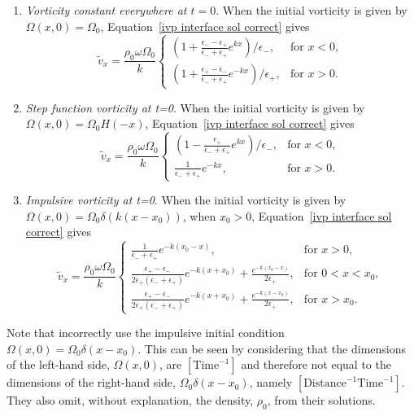 \documentclass[12pt]{../style-files/ociamthesis}
\begin{document}
\begin{enumerate}
	\item \textit{Vorticity constant everywhere at $t = 0$}. When the initial vorticity is given by $\Omega(x,0) = \Omega_0$, Equation~\eqref{ivp interface sol correct} gives
	\begin{equation}
	\tilde{v}_x = \frac{\rho_0\omega\Omega_0}{k}
	\begin{cases}
	(1 + \frac{\epsilon_- - \epsilon_+}{\epsilon_- + \epsilon_+}e^{kx})/\epsilon_-, & \text{for } x<0, \\
	(1 + \frac{\epsilon_+ - \epsilon_-}{\epsilon_- + \epsilon_+}e^{-kx})/\epsilon_+, & \text{for } x>0.
	\end{cases}
	\end{equation}
	\item \textit{Step function vorticity at t=0}. When the initial vorticity is given by $\Omega(x,0) = \Omega_0H(-x)$, Equation~\eqref{ivp interface sol correct} gives
	\begin{equation}
	\tilde{v}_x = \frac{\rho_0\omega\Omega_0}{k}
	\begin{cases}
	(1 - \frac{\epsilon_+}{\epsilon_- + \epsilon_+}e^{kx})/\epsilon_-, & \text{for } x<0, \\
	\frac{1}{\epsilon_- + \epsilon_+}e^{-kx}, & \text{for } x>0.
	\end{cases}
	\end{equation}
	\item \textit{Impulsive vorticity at t=0}. When the initial vorticity is given by {$\Omega(x,0) = \Omega_0\delta(k(x-x_0))$}, when $x_0>0$, Equation~\eqref{ivp interface sol correct} gives
	\begin{equation}
	\tilde{v}_x = \frac{\rho_0\omega\Omega_0}{k}
	\begin{cases}
	\frac{1}{\epsilon_- + \epsilon_+}e^{-k(x_0 - x)}, & \text{for } x>0, \\
	\frac{\epsilon_+ - \epsilon_-}{2\epsilon_+(\epsilon_- + \epsilon_+)}e^{-k(x + x_0)} + \frac{e^{-k(x_0 - x)}}{2\epsilon_+}, & \text{for } 0<x<x_0, \\
	\frac{\epsilon_+ - \epsilon_-}{2\epsilon_+(\epsilon_- + \epsilon_+)}e^{-k(x + x_0)} + \frac{e^{-k(x - x_0)}}{2\epsilon_+}, & \text{for } x>x_0.
	\end{cases}
	\end{equation}
\end{enumerate}
Note that \cite{rae_etal81} incorrectly use the impulsive initial condition $\Omega(x,0) = \Omega_0\delta(x-x_0)$. This can be seen by considering that the dimensions of the left-hand side, $\Omega(x,0)$, are $[\mathrm{Time}^{-1}]$ and therefore not equal to the dimensions of the right-hand side, $\Omega_0\delta(x-x_0)$, namely $[\mathrm{Distance}^{-1}\mathrm{Time}^{-1}]$. They also omit, without explanation, the density, $\rho_0$, from their solutions.
\end{document}
